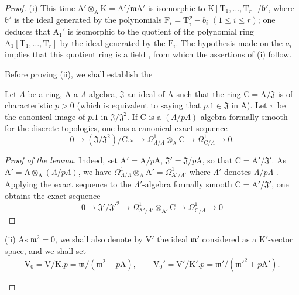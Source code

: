 \begin{proof}
(i) This time $\mathrm{A}'\otimes_\mathrm{A}\mathrm{K}=\mathrm{A}'/\mathfrak{m}\mathrm{A}'$ is isomorphic to $\mathrm{K}[\mathrm{T}_1,\ldots,\mathrm{T}_r]/\mathfrak{b}'$, where $\mathfrak{b}'$ is the ideal generated by the polynomials $\mathrm{F}_i=\mathrm{T}_i^p-b_i$ $(1\leq i\leq r)$; one deduces that $\mathrm{A}_1'$ is isomorphic to the quotient of the polynomial ring $\mathrm{A}_1[\mathrm{T}_1,\ldots,\mathrm{T}_r]$ by the ideal generated by the $\mathrm{F}_i$.
The hypothesis made on the $a_i$ implies that this quotient ring is a field , from which the assertions of (i) follow.

Before proving (ii), we shall establish the

\begin{lemma}[22.4.4.2]
\label{0.22.4.4.2}
Let $\Lambda$ be a ring, $\mathrm{A}$ a $\Lambda$-algebra, $\mathfrak{J}$ an ideal of $\mathrm{A}$ such that the ring $\mathrm{C}=\mathrm{A}/\mathfrak{J}$ is of characteristic $p>0$ (which is equivalent to saying that $p.1\in\mathfrak{J}$ in $\mathrm{A}$).
Let $\pi$ be the canonical image of $p.1$ in $\mathfrak{J}/\mathfrak{J}^2$.
If $\mathrm{C}$ is a $(\Lambda/p\Lambda)$-algebra formally smooth for the discrete topologies, one has a canonical exact sequence
\[
\label{0.22.4.4.3}
  0\to(\mathfrak{J}/\mathfrak{J}^2)/\mathrm{C}.\pi\to\Omega^1_{\Lambda/\Lambda}\otimes_\mathrm{A}\mathrm{C}\to\Omega^1_{\mathrm{C}/\Lambda}\to 0.
  \tag{22.4.4.3}
\]
\end{lemma}

\begin{proof}[Proof of the lemma]
Indeed, set $\mathrm{A}'=\mathrm{A}/p\mathrm{A}$, $\mathfrak{J}'=\mathfrak{J}/p\mathrm{A}$, so that $\mathrm{C}=\mathrm{A}'/\mathfrak{J}'$.
As $\mathrm{A}'=\mathrm{A}\otimes_\mathrm{A}(\Lambda/p\Lambda)$, we have $\Omega^1_{\Lambda/\Lambda}\otimes_\mathrm{A}\mathrm{A}'=\Omega^1_{\mathrm{A}'/\Lambda'}$ where $\Lambda'$ denotes $\Lambda/p\Lambda$ .
Applying the exact sequence  to the $\Lambda'$-algebra formally smooth $\mathrm{C}=\mathrm{A}'/\mathfrak{J}'$, one obtains the exact sequence
\[
  0\to\mathfrak{J}'/\mathfrak{J}'^2\to\Omega^1_{\mathrm{A}'/\Lambda'}\otimes_{\mathrm{A}'}\mathrm{C}\to\Omega^1_{\mathrm{C}/\Lambda}\to 0
\]
\end{proof}

\begin{env}[22.4.4.4]
\label{0.22.4.4.4}
(ii) As $\mathfrak{m}^2=0$, we shall also denote by $\mathrm{V}'$ the ideal $\mathfrak{m}'$ considered as a $\mathrm{K}'$-vector space, and we shall set
\[
  \mathrm{V}_0=\mathrm{V}/\mathrm{K}.p=\mathfrak{m}/(\mathfrak{m}^2+p\mathrm{A}),\qquad \mathrm{V}_0'=\mathrm{V}'/\mathrm{K}'.p=\mathfrak{m}'/(\mathfrak{m}'^2+p\mathrm{A}').
\]


\end{env}
\end{proof}
